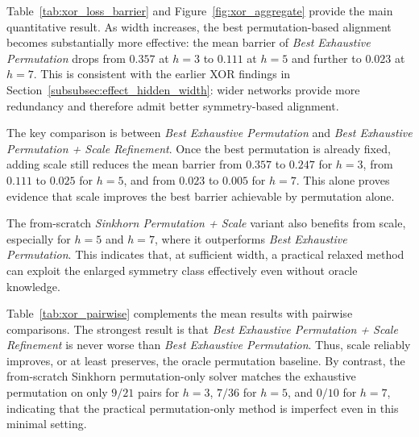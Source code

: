 \documentclass[11pt,a4paper]{report}
\begin{document}
Table~\ref{tab:xor_loss_barrier} and Figure~\ref{fig:xor_aggregate} provide the main quantitative result. As width increases, the best permutation-based alignment becomes substantially more effective: the mean barrier of \emph{Best Exhaustive Permutation} drops from \(0.357\) at \(h=3\) to \(0.111\) at \(h=5\) and further to \(0.023\) at \(h=7\). This is consistent with the earlier XOR findings in Section~\ref{subsubsec:effect_hidden_width}: wider networks provide more redundancy and therefore admit better symmetry-based alignment.

The key comparison is between \emph{Best Exhaustive Permutation} and \emph{Best Exhaustive Permutation + Scale Refinement}. Once the best permutation is already fixed, adding scale still reduces the mean barrier from \(0.357\) to \(0.247\) for \(h=3\), from \(0.111\) to \(0.025\) for \(h=5\), and from \(0.023\) to \(0.005\) for \(h=7\). This alone proves evidence that scale improves the best barrier achievable by permutation alone.

The from-scratch \emph{Sinkhorn Permutation + Scale} variant also benefits from scale, especially for \(h=5\) and \(h=7\), where it outperforms \emph{Best Exhaustive Permutation}. This indicates that, at sufficient width, a practical relaxed method can exploit the enlarged symmetry class effectively even without oracle knowledge.

\begin{table}[H]
\centering
\small
{}
\caption{Pairwise comparison counts across valid XOR model pairs. Lower barrier is better. Here, Exh.\ Perm.\ denotes Best Exhaustive Permutation, Exh.\ Perm.\ + Scale Ref.\ denotes Best Exhaustive Permutation + Scale Refinement, Sinkhorn Perm.\ Only denotes Sinkhorn Permutation Only, and Sinkhorn Perm.\ + Scale denotes Sinkhorn Permutation + Scale.}
\label{tab:xor_pairwise}
\end{table}
Table~\ref{tab:xor_pairwise} complements the mean results with pairwise comparisons. The strongest result is that \emph{Best Exhaustive Permutation + Scale Refinement} is never worse than \emph{Best Exhaustive Permutation}. Thus, scale reliably improves, or at least preserves, the oracle permutation baseline. By contrast, the from-scratch Sinkhorn permutation-only solver matches the exhaustive permutation on only \(9/21\) pairs for \(h=3\), \(7/36\) for \(h=5\), and \(0/10\) for \(h=7\), indicating that the practical permutation-only method is imperfect even in this minimal setting.
\end{document}
